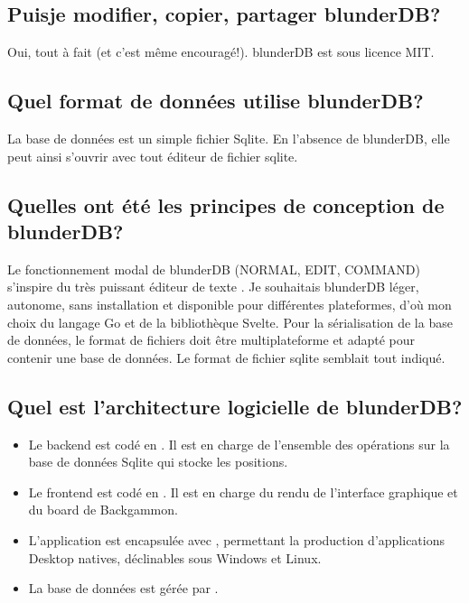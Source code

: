 \documentclass[letterpaper,10pt,french]{sphinxmanual}
\begin{document}
\subsection{Puis\sphinxhyphen{}je modifier, copier, partager blunderDB?}
\label{\detokenize{faq:puis-je-modifier-copier-partager-blunderdb}}
\sphinxAtStartPar
Oui, tout à fait (et c’est même encouragé!). blunderDB est sous licence MIT.


\subsection{Quel format de données utilise blunderDB?}
\label{\detokenize{faq:quel-format-de-donnees-utilise-blunderdb}}
\sphinxAtStartPar
La base de données est un simple fichier Sqlite. En l’absence de
blunderDB, elle peut ainsi s’ouvrir avec tout éditeur de fichier sqlite.


\subsection{Quelles ont été les principes de conception de blunderDB?}
\label{\detokenize{faq:quelles-ont-ete-les-principes-de-conception-de-blunderdb}}
\sphinxAtStartPar
Le fonctionnement modal de blunderDB (NORMAL, EDIT, COMMAND) s’inspire du très
puissant éditeur de texte . Je souhaitais blunderDB
léger, autonome, sans installation et disponible pour différentes plateformes,
d’où mon choix du langage Go et de la bibliothèque Svelte. Pour la
sérialisation de la base de données, le format de fichiers doit être
multi\sphinxhyphen{}plateforme et adapté pour contenir une base de données. Le format de
fichier sqlite semblait tout indiqué.


\subsection{Quel est l’architecture logicielle de blunderDB?}
\label{\detokenize{faq:quel-est-l-architecture-logicielle-de-blunderdb}}\begin{itemize}
\item {} 
\sphinxAtStartPar
Le backend est codé en . Il est en charge de
l’ensemble des opérations sur la base de données Sqlite qui stocke les
positions.

\item {} 
\sphinxAtStartPar
Le frontend est codé en . Il est en charge du
rendu de l’interface graphique et du board de Backgammon.

\item {} 
\sphinxAtStartPar
L’application est encapsulée avec , permettant la
production d’applications Desktop natives, déclinables sous Windows et Linux.

\item {} 
\sphinxAtStartPar
La base de données est gérée par .

\end{itemize}
\end{document}
